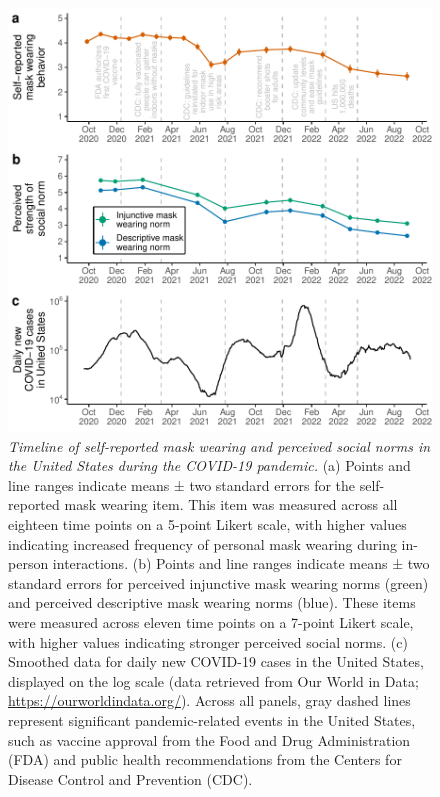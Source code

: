 \documentclass[
  man, donotrepeattitle,mask,floatsintext]{apa6}
\begin{document}
\begin{figure}
\centering
\includegraphics{manuscript_files/figure-latex/plotTimeline-1.pdf}
\caption{\label{fig:plotTimeline}\emph{Timeline of self-reported mask wearing and perceived social norms in the United States during the COVID-19 pandemic.} (a) Points and line ranges indicate means ± two standard errors for the self-reported mask wearing item. This item was measured across all eighteen time points on a 5-point Likert scale, with higher values indicating increased frequency of personal mask wearing during in-person interactions. (b) Points and line ranges indicate means ± two standard errors for perceived injunctive mask wearing norms (green) and perceived descriptive mask wearing norms (blue). These items were measured across eleven time points on a 7-point Likert scale, with higher values indicating stronger perceived social norms. (c) Smoothed data for daily new COVID-19 cases in the United States, displayed on the log scale (data retrieved from Our World in Data; \url{https://ourworldindata.org/}). Across all panels, gray dashed lines represent significant pandemic-related events in the United States, such as vaccine approval from the Food and Drug Administration (FDA) and public health recommendations from the Centers for Disease Control and Prevention (CDC).}
\end{figure}
\end{document}
